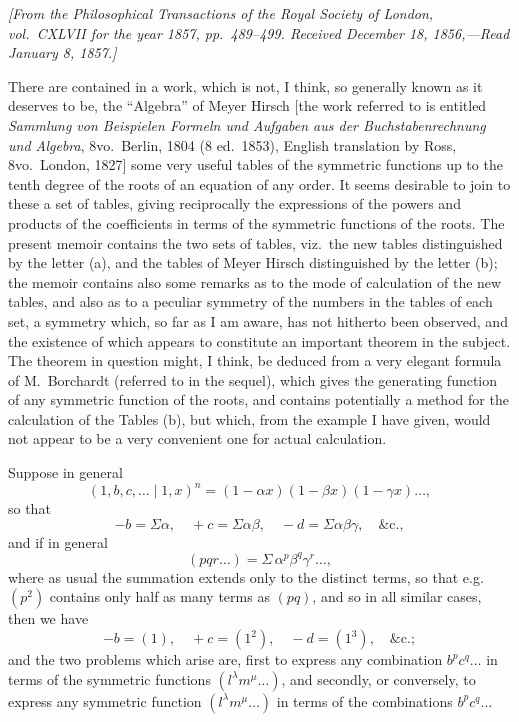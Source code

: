 \documentclass[11pt]{article}
\begin{document}
\noindent\textit{[From the Philosophical Transactions of the Royal Society of London, vol.~CXLVII for the year 1857, pp.~489--499. Received December 18, 1856,---Read January 8, 1857.]}

\medskip

\noindent There are contained in a work, which is not, I think, so generally known as it deserves to be, the ``Algebra'' of Meyer Hirsch [the work referred to is entitled \textit{Sammlung von Beispielen Formeln und Aufgaben aus der Buchstabenrechnung und Algebra}, 8vo.\ Berlin, 1804 (8 ed.\ 1853), English translation by Ross, 8vo.\ London, 1827] some very useful tables of the symmetric functions up to the tenth degree of the roots of an equation of any order. It seems desirable to join to these a set of tables, giving reciprocally the expressions of the powers and products of the coefficients in terms of the symmetric functions of the roots. The present memoir contains the two sets of tables, viz.\ the new tables distinguished by the letter (a), and the tables of Meyer Hirsch distinguished by the letter (b); the memoir contains also some remarks as to the mode of calculation of the new tables, and also as to a peculiar symmetry of the numbers in the tables of each set, a symmetry which, so far as I am aware, has not hitherto been observed, and the existence of which appears to constitute an important theorem in the subject. The theorem in question might, I think, be deduced from a very elegant formula of M.~Borchardt (referred to in the sequel), which gives the generating function of any symmetric function of the roots, and contains potentially a method for the calculation of the Tables (b), but which, from the example I have given, would not appear to be a very convenient one for actual calculation.

Suppose in general
\[
(1, b, c, \ldots \mid 1, x)^n = (1 - \alpha x)(1 - \beta x)(1 - \gamma x)\ldots,
\]
so that
\[
-b = \Sigma\alpha,\quad +c = \Sigma\alpha\beta,\quad -d = \Sigma\alpha\beta\gamma,\quad \&\text{c.},
\]
and if in general
\[
(pqr\ldots) = \Sigma\,\alpha^p \beta^q \gamma^r \ldots,
\]
where as usual the summation extends only to the distinct terms, so that e.g.\ $(p^2)$ contains only half as many terms as $(pq)$, and so in all similar cases, then we have
\[
-b = (1),\quad +c = (1^2),\quad -d = (1^3),\quad \&\text{c.};
\]
and the two problems which arise are, first to express any combination $b^p c^q \ldots$ in terms of the symmetric functions $(l^\lambda m^\mu \ldots)$, and secondly, or conversely, to express any symmetric function $(l^\lambda m^\mu \ldots)$ in terms of the combinations $b^p c^q\ldots$
\end{document}
